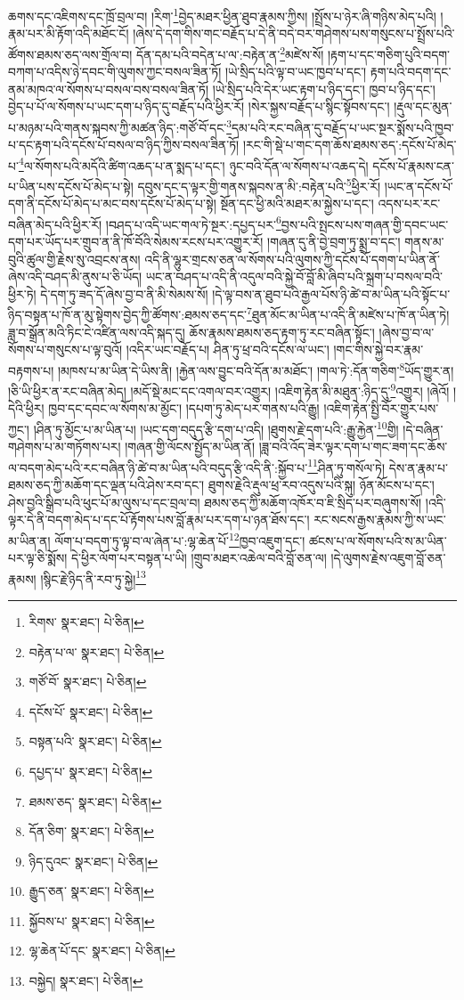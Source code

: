 ཆགས་དང་འཇིགས་དང་ཁྲོ་བྲལ་བ། །རིག་\footnote{རིགས་  སྣར་ཐང་།  པེ་ཅིན། }བྱེད་མཐར་ཕྱིན་ཐུབ་རྣམས་ཀྱིས། །སྤྲོས་པ་ཉེར་ཞི་གཉིས་མེད་པའི། །རྣམ་པར་མི་རྟོག་འདི་མཐོང་ངོ། །ཞེས་དེ་དག་གིས་གང་བརྗོད་པ་དེ་ནི་བདེ་བར་གཤེགས་པས་གསུངས་པ་སྤྲོས་པའི་ཚོགས་ཐམས་ཅད་ལས་གྲོལ་བ། དོན་དམ་པའི་བདེན་པ་ལ་:བརྟེན་ན་\footnote{བརྟེན་པ་ལ་  སྣར་ཐང་།  པེ་ཅིན། }མཛེས་སོ། །རྟག་པ་དང་གཅིག་པུའི་བདག་བཀག་པ་འདིས་ཉེ་དབང་གི་ལུགས་ཀྱང་བསལ་ཟིན་ཏོ། །ཡེ་སྲིད་པའི་ལྟ་བ་ཡང་ཁྱབ་པ་དང་། རྟག་པའི་བདག་དང་ནམ་མཁའ་ལ་སོགས་པ་བསལ་བས་བསལ་ཟིན་ཏོ། །ཡེ་སྲིད་པའི་དེར་ཡང་རྟག་པ་ཉིད་དང་། ཁྱབ་པ་ཉིད་དང་། བྱེད་པ་པོ་ལ་སོགས་པ་ཡང་དག་པ་ཉིད་དུ་བརྗོད་པའི་ཕྱིར་རོ། །སེར་སྐྱས་བརྗོད་པ་སྙིང་སྟོབས་དང་། །རྡུལ་དང་མུན་པ་མཉམ་པའི་གནས་སྐབས་ཀྱི་མཚན་ཉིད་:གཙོ་བོ་དང་\footnote{གཙོ་བོ་  སྣར་ཐང་།  པེ་ཅིན། }དམ་པའི་རང་བཞིན་དུ་བརྗོད་པ་ཡང་སྔར་སྨོས་པའི་ཁྱབ་པ་དང་རྟག་པའི་དངོས་པོ་བསལ་བ་ཉིད་ཀྱིས་བསལ་ཟིན་ཏོ། །རང་གི་སྡེ་པ་གང་དག་ཆོས་ཐམས་ཅད་:དངོས་པོ་མེད་པ་\footnote{དངོས་པོ་  སྣར་ཐང་།  པེ་ཅིན། }ལ་སོགས་པའི་མདོའི་ཚིག་འཆད་པ་ན་སྨད་པ་དང་། ཉུང་བའི་དོན་ལ་སོགས་པ་འཆད་དེ། དངོས་པོ་རྣམས་ངན་པ་ཡིན་པས་དངོས་པོ་མེད་པ་སྟེ། དབུས་དང་ད་ལྟར་གྱི་གནས་སྐབས་ན་མི་:བརྟེན་པའི་\footnote{བསྟན་པའི་  སྣར་ཐང་།  པེ་ཅིན། }ཕྱིར་རོ། །ཡང་ན་དངོས་པོ་དག་ནི་དངོས་པོ་མེད་པ་མང་བས་དངོས་པོ་མེད་པ་སྟེ། སྔོན་དང་ཕྱི་མའི་མཐར་མ་སྐྱེས་པ་དང་། འདས་པར་རང་བཞིན་མེད་པའི་ཕྱིར་རོ། །བཤད་པ་འདི་ཡང་གལ་ཏེ་སྔར་:དཔྱད་པར་\footnote{དཔྱད་པ་  སྣར་ཐང་།  པེ་ཅིན། }བྱས་པའི་སྤངས་པས་གཞན་གྱི་དབང་ཡང་དག་པར་ཡོད་པར་གྲུབ་ན་ནི་ཁོ་བོའི་སེམས་རངས་པར་འགྱུར་རོ། །གཞན་དུ་ནི་བྱེ་བྲག་ཏུ་སྨྲ་བ་དང་། གནས་མ་བུའི་ཚུལ་གྱི་རྗེས་སུ་འབྲངས་ནས། འདི་ནི་ལྷུར་གྲངས་ཅན་ལ་སོགས་པའི་ལུགས་ཀྱི་དངོས་པོ་དགག་པ་ཡིན་ནོ་ཞེས་འདི་བཤད་མི་ནུས་པ་ཅི་ཡོད། ཡང་ན་བཤད་པ་འདི་ནི་འདུལ་བའི་སྐྱེ་བོ་བློ་མི་ཞིབ་པའི་སྐྲག་པ་བསལ་བའི་ཕྱིར་ཏེ། དེ་དག་ཏུ་ཟད་དོ་ཞེས་བྱ་བ་ནི་མི་སེམས་སོ། །དེ་ལྟ་བས་ན་ཐུབ་པའི་རྒྱལ་པོས་ཉི་ཚེ་བ་མ་ཡིན་པའི་སྟོང་པ་ཉིད་བསྟན་པ་ཁོ་ན་མུ་སྟེགས་བྱེད་ཀྱི་ཚོགས་:ཐམས་ཅད་དང་\footnote{ཐམས་ཅད་  སྣར་ཐང་།  པེ་ཅིན། }ཐུན་མོང་མ་ཡིན་པ་འདི་ནི་མཛེས་པ་ཁོ་ན་ཡིན་ཏེ། ཟླ་བ་སྒྲོན་མའི་ཏིང་ངེ་འཛིན་ལས་འདི་སྐད་དུ། ཆོས་རྣམས་ཐམས་ཅད་རྟག་ཏུ་རང་བཞིན་སྟོང་། །ཞེས་བྱ་བ་ལ་སོགས་པ་གསུངས་པ་ལྟ་བུའོ། །འདིར་ཡང་བརྗོད་པ། ཤིན་ཏུ་ཕྲ་བའི་དངོས་ལ་ཡང་། །གང་གིས་སྐྱེ་བར་རྣམ་བརྟགས་པ། །མཁས་པ་མ་ཡིན་དེ་ཡིས་ནི། །རྐྱེན་ལས་བྱུང་བའི་དོན་མ་མཐོང་། །གལ་ཏེ་:དོན་གཅིག་\footnote{དོན་ཅིག་  སྣར་ཐང་།  པེ་ཅིན། }ཡོད་གྱུར་ན། །ཅི་ཡི་ཕྱིར་ན་རང་བཞིན་མེད། །མདོ་སྡེ་མང་དང་འགལ་བར་འགྱུར། །འཇིག་རྟེན་མི་མཐུན་:ཉིད་དུ་\footnote{ཉིད་དུའང་  སྣར་ཐང་།  པེ་ཅིན། }འགྱུར། །ཞེའོ། །དེའི་ཕྱིར། ཁྱབ་དང་དབང་ལ་སོགས་མ་མྱོང་། །དཔག་ཏུ་མེད་པར་གནས་པའི་རྒྱུ། །འཇིག་རྟེན་སྤྱི་བོར་གྱུར་པས་ཀྱང་། །ཤིན་ཏུ་མྱོང་པ་མ་ཡིན་པ། །ཡང་དག་བདུད་རྩི་དག་པ་འདི། །ཐུགས་རྗེ་དག་པའི་:རྒྱུ་རྐྱེན་\footnote{རྒྱུད་ཅན་  སྣར་ཐང་།  པེ་ཅིན། }གྱི། །དེ་བཞིན་གཤེགས་པ་མ་གཏོགས་པར། །གཞན་གྱི་ལོངས་སྤྱོད་མ་ཡིན་ནོ། །ཟླ་བའི་འོད་ཟེར་ལྟར་དག་པ་གང་ཟག་དང་ཆོས་ལ་བདག་མེད་པའི་རང་བཞིན་ཉི་ཚེ་བ་མ་ཡིན་པའི་བདུད་རྩི་འདི་ནི་:སྐྱོབ་པ་\footnote{སྐྱོབས་པ་  སྣར་ཐང་།  པེ་ཅིན། }ཤིན་ཏུ་གསོལ་ཏེ། དེས་ན་རྣམ་པ་ཐམས་ཅད་ཀྱི་མཆོག་དང་ལྡན་པའི་ཤེས་རབ་དང་། ཐུགས་རྗེའི་རྡུལ་ཕྲ་རབ་འདུས་པའི་སྐུ། ཉོན་མོངས་པ་དང་། ཤེས་བྱའི་སྒྲིབ་པའི་ཕུང་པོ་མ་ལུས་པ་དང་བྲལ་བ། ཐམས་ཅད་ཀྱི་མཆོག་འཁོར་བ་ཇི་སྲིད་པར་བཞུགས་སོ། །འདི་ལྟར་དེ་ནི་བདག་མེད་པ་དང་པོ་རྟོགས་པས་བློ་རྣམ་པར་དག་པ་ཉན་ཐོས་དང་། རང་སངས་རྒྱས་རྣམས་ཀྱི་ས་ཡང་མ་ཡིན་ན། ལོག་པ་བདག་ཏུ་ལྟ་བ་ལ་ཞེན་པ་:ལྷ་ཆེན་པོ་\footnote{ལྷ་ཆེན་པོ་དང་  སྣར་ཐང་།  པེ་ཅིན། }ཁྱབ་འཇུག་དང་། ཚངས་པ་ལ་སོགས་པའི་ས་མ་ཡིན་པར་ལྟ་ཅི་སྨོས། དེ་ཕྱིར་ལོག་པར་བསྟན་པ་ཡི། །གྲུབ་མཐར་འཆེལ་བའི་བློ་ཅན་ལ། །དེ་ལུགས་རྗེས་འཇུག་བློ་ཅན་རྣམས། །སྙིང་རྗེ་ཉིད་ནི་རབ་ཏུ་སྐྱེ།\footnote{བསྐྱེད།  སྣར་ཐང་།  པེ་ཅིན། } 